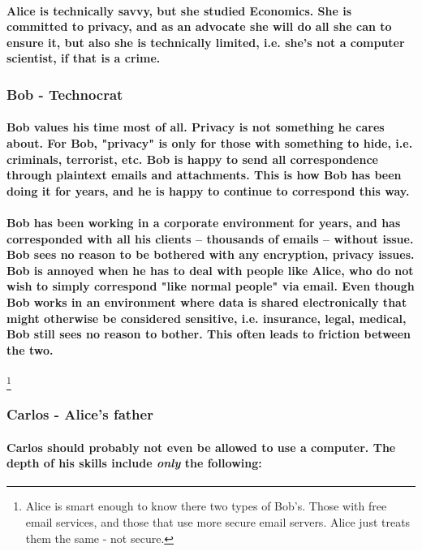 \documentclass[12pt,a4paper]{article}
\begin{document}
\paragraph{Alice is technically savvy, but she studied Economics. She is committed to privacy, and as an advocate she will do all she can to ensure it, but also she is technically limited, i.e. she's not a computer scientist, if that is a crime.}

\subsubsection{Bob - Technocrat}

\paragraph{Bob values his time most of all. Privacy is not something he cares about. For Bob, "privacy" is only for those with something to hide, i.e. criminals, terrorist, etc. Bob is happy to send all correspondence through plaintext emails and attachments. This is how Bob has been doing it for years, and he is happy to continue to correspond this way.}

\paragraph{Bob has been working in a corporate environment for years, and has corresponded with all his clients -- thousands of emails -- without issue. Bob sees no reason to be bothered with any encryption, privacy issues. Bob is annoyed when he has to deal with people like Alice, who do not wish to simply correspond "like normal people" via email. Even though Bob works in an environment where data is shared electronically that might otherwise be considered sensitive, i.e. insurance, legal, medical, Bob still sees no reason to bother. This often leads to friction between the two.}
\footnote{Alice is smart enough to know there two types of Bob's. Those with free email services, and those that use more secure email servers. Alice just treats them the same - not secure.}

\subsubsection{Carlos - Alice's father}
\paragraph{Carlos should probably not even be allowed to use a computer. The depth of his skills include \emph{only} the following:}
\end{document}
